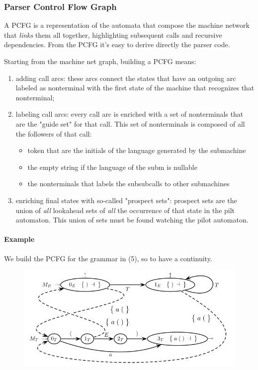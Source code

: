			\subsubsection{Parser Control Flow Graph}
				A PCFG is a representation of the automata that compose the machine network that \emph{links} them all together, highlighting subsequent calls 
				and recursive dependencies. From the PCFG it's easy to derive directly the parser code.

				Starting from the machine net graph, building a PCFG means:
				\begin{enumerate}
					\item adding call arcs: these arcs connect the states that have an outgoing arc labeled as nonterminal with the first state of the machine that 
					recognizes that nonterminal;
					\item labeling call arcs: every call arc is enriched with a set of nonterminals that are the "guide set" for that call. This set of nonterminals 
					is composed of all the followers of that call:
						\begin{itemize}
							\item token that are the initials of the language generated by the submachine
							\item the empty string if the language of the subm is nullable
							\item the nonterminals that labels the subsubcalls to other submachines
						\end{itemize}
					\item enriching final states with so-called "prospect sets": prospect sets are the union of \emph{all} lookahead sets of \emph{all} the 
					occurrence of that state in the pilt automaton. This union of sets must be found watching the pilot automaton. 
				\end{enumerate}
				
				\paragraph{Example}
					We build the PCFG for the grammar in (5), so to have a continuity.
					\begin{figure}[H]
						\centering
						\includegraphics[width = \textwidth]{./images/PCFG.png}
					\end{figure}
			 
